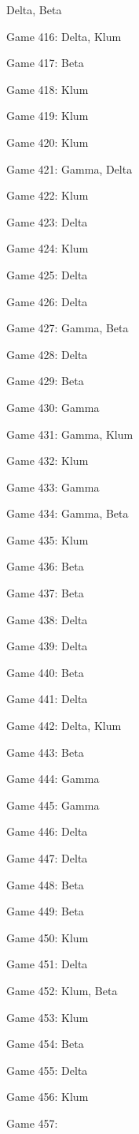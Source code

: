 \documentclass{article}
\begin{document}
\begin{multicols}{3}
\begin{compactitem}
Delta, Beta
\item Game 416:
Delta, Klum
\item Game 417:
Beta
\item Game 418:
Klum
\item Game 419:
Klum
\item Game 420:
Klum
\item Game 421:
Gamma, Delta
\item Game 422:
Klum
\item Game 423:
Delta
\item Game 424:
Klum
\item Game 425:
Delta
\item Game 426:
Delta
\item Game 427:
Gamma, Beta
\item Game 428:
Delta
\item Game 429:
Beta
\item Game 430:
Gamma
\item Game 431:
Gamma, Klum
\item Game 432:
Klum
\item Game 433:
Gamma
\item Game 434:
Gamma, Beta
\item Game 435:
Klum
\item Game 436:
Beta
\item Game 437:
Beta
\item Game 438:
Delta
\item Game 439:
Delta
\item Game 440:
Beta
\item Game 441:
Delta
\item Game 442:
Delta, Klum
\item Game 443:
Beta
\item Game 444:
Gamma
\item Game 445:
Gamma
\item Game 446:
Delta
\item Game 447:
Delta
\item Game 448:
Beta
\item Game 449:
Beta
\item Game 450:
Klum
\item Game 451:
Delta
\item Game 452:
Klum, Beta
\item Game 453:
Klum
\item Game 454:
Beta
\item Game 455:
Delta
\item Game 456:
Klum
\item Game 457:

\end{compactitem}
\end{multicols}
\end{document}

